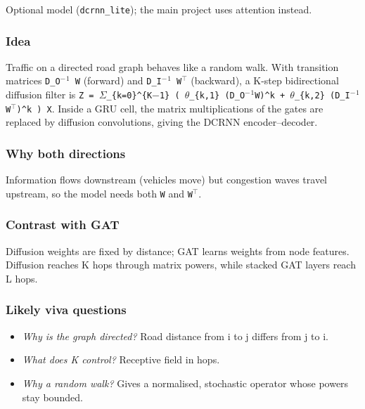 \documentclass[10pt,a4paper]{article}
\begin{document}
Optional model (\texttt{dcrnn\_\allowbreak{}lite}); the main project uses attention instead.

\subsubsection*{Idea}
Traffic on a directed road graph behaves like a random walk. With transition matrices \texttt{D\_\allowbreak{}O\ensuremath{^{-}}\ensuremath{^{1}} W} (forward) and \texttt{D\_\allowbreak{}I\ensuremath{^{-}}\ensuremath{^{1}} W\ensuremath{^{\top}}} (backward), a K-step bidirectional diffusion filter is \texttt{Z = \ensuremath{\Sigma}\_\allowbreak{}\{k=0\}\^{}\{K\ensuremath{-}1\} ( \ensuremath{\theta}\_\allowbreak{}\{k,1\} (D\_\allowbreak{}O\ensuremath{^{-}}\ensuremath{^{1}}W)\^{}k + \ensuremath{\theta}\_\allowbreak{}\{k,2\} (D\_\allowbreak{}I\ensuremath{^{-}}\ensuremath{^{1}}W\ensuremath{^{\top}})\^{}k ) X}. Inside a GRU cell, the matrix multiplications of the gates are replaced by diffusion convolutions, giving the DCRNN encoder--decoder.

\subsubsection*{Why both directions}
Information flows downstream (vehicles move) but congestion waves travel upstream, so the model needs both \texttt{W} and \texttt{W\ensuremath{^{\top}}}.

\subsubsection*{Contrast with GAT}
Diffusion weights are fixed by distance; GAT learns weights from node features. Diffusion reaches K hops through matrix powers, while stacked GAT layers reach L hops.

\subsubsection*{Likely viva questions}
\begin{itemize}[nosep,leftmargin=*]
\item \emph{Why is the graph directed?} Road distance from i to j differs from j to i.
\item \emph{What does K control?} Receptive field in hops.
\item \emph{Why a random walk?} Gives a normalised, stochastic operator whose powers stay bounded.
\end{itemize}
\end{document}
